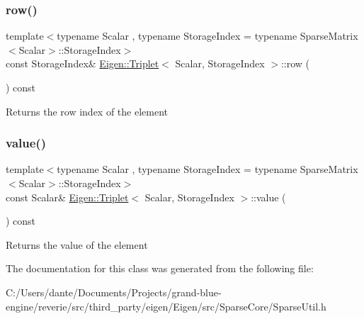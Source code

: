 \subsubsection{\texorpdfstring{row()}{row()}}
{\footnotesize\ttfamily template$<$typename Scalar , typename Storage\+Index  = typename Sparse\+Matrix$<$\+Scalar$>$\+::\+Storage\+Index$>$ \\
const Storage\+Index\& \mbox{\hyperlink{class_eigen_1_1_triplet}{Eigen\+::\+Triplet}}$<$ Scalar, Storage\+Index $>$\+::row (\begin{DoxyParamCaption}{ }\end{DoxyParamCaption}) const\hspace{0.3cm}{\ttfamily [inline]}}

\begin{DoxyReturn}{Returns}
the row index of the element 
\end{DoxyReturn}
\mbox{\label{class_eigen_1_1_triplet_a003ea53c6559b106406f7916d6610547}} 
\subsubsection{\texorpdfstring{value()}{value()}}
{\footnotesize\ttfamily template$<$typename Scalar , typename Storage\+Index  = typename Sparse\+Matrix$<$\+Scalar$>$\+::\+Storage\+Index$>$ \\
const Scalar\& \mbox{\hyperlink{class_eigen_1_1_triplet}{Eigen\+::\+Triplet}}$<$ Scalar, Storage\+Index $>$\+::value (\begin{DoxyParamCaption}{ }\end{DoxyParamCaption}) const\hspace{0.3cm}{\ttfamily [inline]}}

\begin{DoxyReturn}{Returns}
the value of the element 
\end{DoxyReturn}


The documentation for this class was generated from the following file\+:\begin{DoxyCompactItemize}
\item 
C\+:/\+Users/dante/\+Documents/\+Projects/grand-\/blue-\/engine/reverie/src/third\+\_\+party/eigen/\+Eigen/src/\+Sparse\+Core/Sparse\+Util.\+h\end{DoxyCompactItemize}
